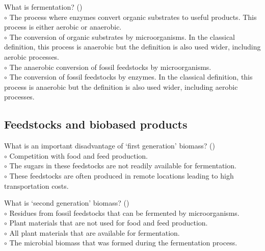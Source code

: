 \documentclass[]{beamer}
\begin{document}
\begin{CJK}{UTF8}{gbsn}
\begin{frame}[shrink] {} 
\addtocounter{questions}{1}
\color{blue}
  What is fermentation? 
 ({})\\
\color{black}
\setlength{\parindent}{-0.4cm}
{\color{red}$\circ$} The process where enzymes convert organic substrates to useful products. This process is either aerobic or anaerobic.  \\
{\color{red}$\circ$}  The conversion of organic substrates by microorganisms. In the classical definition, this process is anaerobic but the definition is also used wider, including aerobic processes.  \\
{\color{red}$\circ$} The anaerobic conversion of fossil feedstocks by microorganisms.  \\
{\color{red}$\circ$} The conversion of fossil feedstocks by enzymes. In the classical definition, this process is anaerobic but the definition is also used wider, including aerobic processes.  \\

\end{frame}
\subsection{Feedstocks and biobased products }
\setcounter{questions}{0}


\begin{frame}[shrink] {} 
\addtocounter{questions}{1}
\color{blue}
  What is an important disadvantage of ‘first generation’ biomass?
 ({})\\
\color{black}
\setlength{\parindent}{-0.4cm}
{\color{red}$\circ$}  Competition with food and feed production.  \\
{\color{red}$\circ$} The sugars in these feedstocks are not readily available for fermentation.  \\
{\color{red}$\circ$} These feedstocks are often produced in remote locations leading to high transportation costs.  \\
\end{frame}


\begin{frame}[shrink] {} 
\addtocounter{questions}{1}
\color{blue}
  What is ‘second generation’ biomass?
 ({})\\
\color{black}
\setlength{\parindent}{-0.4cm}
{\color{red}$\circ$} Residues from fossil feedstocks that can be fermented by microorganisms.  \\
{\color{red}$\circ$}  Plant materials that are not used for food and feed production.  \\
{\color{red}$\circ$} All plant materials that are available for fermentation.  \\
{\color{red}$\circ$} The microbial biomass that was formed during the fermentation process.  \\
\end{frame}



\end{CJK}
\end{document}
